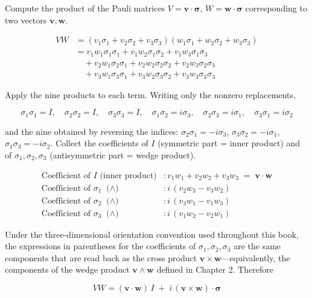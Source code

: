 \documentclass[a4paper,12pt,openany]{book}
\begin{document}
Compute the product of the Pauli matrices
\(V = \mathbf{v}\!\cdot\!\bm{\sigma}\),
\(W = \mathbf{w}\!\cdot\!\bm{\sigma}\) corresponding to two vectors
\(\mathbf{v}, \mathbf{w}\).

\[
\begin{aligned}
VW &= (v_1\sigma_1 + v_2\sigma_2 + v_3\sigma_3)(w_1\sigma_1 + w_2\sigma_2 + w_3\sigma_3) \\[4pt]
&= v_1w_1\sigma_1\sigma_1 + v_1w_2\sigma_1\sigma_2 + v_1w_3\sigma_1\sigma_3 \\
&\quad + v_2w_1\sigma_2\sigma_1 + v_2w_2\sigma_2\sigma_2 + v_2w_3\sigma_2\sigma_3 \\
&\quad + v_3w_1\sigma_3\sigma_1 + v_3w_2\sigma_3\sigma_2 + v_3w_3\sigma_3\sigma_3
\end{aligned}
\]

Apply the nine products to each term. Writing only the nonzero
replacements,

\[
\sigma_1\sigma_1 = I,\quad \sigma_2\sigma_2 = I,\quad \sigma_3\sigma_3 = I,\quad
\sigma_1\sigma_2 = i\sigma_3,\quad \sigma_2\sigma_3 = i\sigma_1,\quad \sigma_3\sigma_1 = i\sigma_2
\]

and the nine obtained by reversing the indices:
\(\sigma_2\sigma_1 = -i\sigma_3\), \(\sigma_3\sigma_2 = -i\sigma_1\),
\(\sigma_1\sigma_3 = -i\sigma_2\). Collect the coefficients of \(I\)
(symmetric part = inner product) and of \(\sigma_1,\sigma_2,\sigma_3\)
(antisymmetric part = wedge product).

\[
\begin{aligned}
\text{Coefficient of }I\text{ (inner product)} &: v_1w_1 + v_2w_2 + v_3w_3 \;=\; \mathbf{v}\!\cdot\!\mathbf{w} \\
\text{Coefficient of }\sigma_1\text{ ($\wedge$)} &: i\,(v_2w_3 - v_3w_2) \\
\text{Coefficient of }\sigma_2\text{ ($\wedge$)} &: i\,(v_3w_1 - v_1w_3) \\
\text{Coefficient of }\sigma_3\text{ ($\wedge$)} &: i\,(v_1w_2 - v_2w_1)
\end{aligned}
\]

Under the three-dimensional orientation convention used throughout this
book, the expressions in parentheses for the coefficients of
\(\sigma_1,\sigma_2,\sigma_3\) are the same components that are read
back as the cross product \(\mathbf{v}\times\mathbf{w}\)—equivalently,
the components of the wedge product \(\mathbf{v}\wedge\mathbf{w}\)
defined in Chapter 2. Therefore

\[VW = (\mathbf{v}\!\cdot\!\mathbf{w})\,I \;+\; i\,(\mathbf{v}\times\mathbf{w})\!\cdot\!\bm{\sigma}\]
\end{document}
